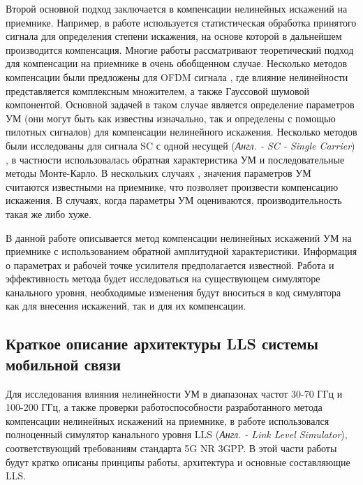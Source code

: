 Второй основной подход заключается в компенсации нелинейных искажений на
приемнике. Например, в работе \cite{maltsev2021} используется
статистическая обработка принятого сигнала для определения степени
искажения, на основе которой в дальнейшем производится компенсация. Многие
работы \cite[]{sharath2015, shabany2008,bhat2016,qi2010,gregorio2007,
bouhadda2015,drotar2010} рассматривают теоретический подход для компенсации
на приемнике в очень обобщенном случае. Несколько методов компенсации были
предложены для OFDM сигнала \cite[]{gregorio2007,bouhadda2015, drotar2010},
где влияние нелинейности представляется комплексным множителем, а также
Гауссовой шумовой компонентой. Основной задачей в таком случае является
определение параметров УМ (они могут быть как известны изначально, так и
определены с помощью пилотных сигналов) для компенсации нелинейного
искажения. Несколько методов были исследованы для сигнала SC с одной несущей
(\textit{Англ. - SC - Single Carrier}) \cite[]{sharath2015,
shabany2008,bhat2016, qi2010}, в частности использовалась обратная
характеристика УМ и последовательные методы Монте-Карло. В нескольких
случаях \cite[]{bhat2016, qi2010,gregorio2007}, значения параметров УМ
считаются известными на приемнике, что позволяет произвести компенсацию
искажения. В случаях, когда параметры УМ оцениваются, производительность
такая же либо хуже.

В данной работе описывается метод компенсации нелинейных искажений УМ на
приемнике с использованием обратной амплитудной характеристики. Информация
о параметрах и рабочей точке усилителя предполагается известной. Работа и
эффективность метода будет исследоваться на существующем симуляторе
канального уровня, необходимые изменения будут вноситься в код симулятора
как для внесения искажений, так и для их компенсации.



\subsection{Краткое описание архитектуры LLS системы мобильной связи}

Для исследования влияния нелинейности УМ в диапазонах частот 30-70 ГГц и
100-200 ГГц, а также проверки работоспособности разработанного метода
компенсации нелинейных искажений на приемнике, в работе использовался
полноценный симулятор канального уровня LLS (\textit{Англ. - Link Level
Simulator}), соответствующий требованиям стандарта 5G NR 3GPP. В этой части
работы будут кратко описаны принципы работы, архитектура и основные
составляющие LLS. 

